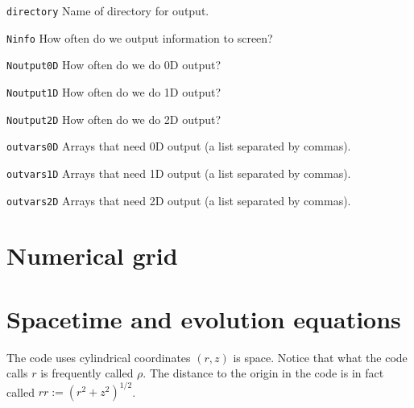 \documentclass[12pt]{article}
\begin{document}
\begin{list}{}{
\setlength{\leftmargin}{35mm}
\setlength{\labelsep}{10mm}
\setlength{\labelwidth}{20mm}}

\item[\texttt{directory}] Name of directory for output.

\item[\texttt{Ninfo}] How often do we output information to screen?

\item[\texttt{Noutput0D}] How often do we do 0D output?

\item[\texttt{Noutput1D}] How often do we do 1D output?

\item[\texttt{Noutput2D}] How often do we do 2D output?

\item[\texttt{outvars0D}] Arrays that need 0D output (a list separated by commas).

\item[\texttt{outvars1D}] Arrays that need 1D output (a list separated by commas).

\item[\texttt{outvars2D}] Arrays that need 2D output (a list separated by commas).

\end{list}

\vspace{3mm}





\setcounter{equation}{0}
\section{Numerical grid}
\label{sec:grid}



\setcounter{equation}{0}
\section{Spacetime and evolution equations}

The code uses cylindrical coordinates $(r,z)$ is space. Notice that
what the code calls $r$ is frequently called $\rho$. The distance to
the origin in the code is in fact called $rr:=(r^2 + z^2)^{1/2}$. \\
\end{document}
